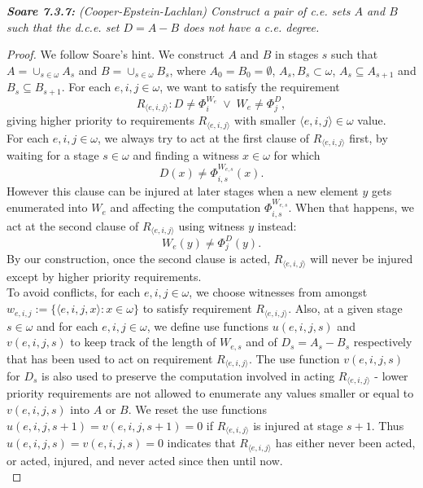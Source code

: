 \documentclass{article}
\begin{document}
\it \textbf{Soare 7.3.7:} (Cooper-Epstein-Lachlan) Construct a pair of c.e.
  sets $A$ and $B$ such that the d.c.e. set $D=A-B$ does not have a c.e.
  degree.

  \begin{proof}
    We follow Soare's hint. We construct $A$ and $B$ in stages $s$ such
    that $A=\cup_{s\in\omega}A_s$ and $B=\cup_{s\in\omega}B_s$, where
    $A_0=B_0=\emptyset$, $A_s,B_s\subset\omega$, $A_s\subseteq A_{s+1}$ and
    $B_s\subseteq B_{s+1}$. For each $e,i,j\in\omega$, we want to satisfy
    the requirement
    \begin{equation}
      R_{\langle e,i,j\rangle}: D\neq \Phi_i^{W_e}\; \vee\;
      W_e\neq\Phi_j^D,
      \label{eq:requirement}
    \end{equation}
    giving higher priority to requirements $R_{\langle e,i,j\rangle}$ with
    smaller $\langle e,i,j\rangle\in\omega$ value. \\

    For each $e,i,j\in\omega$, we always try to act at the first clause
    of $R_{\langle e,i,j\rangle}$ first, by waiting for a stage
    $s\in\omega$ and finding a witness $x\in\omega$ for which
    \[D(x) \neq \Phi_{i,s}^{W_{e,s}}(x).\]
    However this clause can be injured at later stages when a new element
    $y$ gets enumerated into $W_e$ and affecting the computation
    $\Phi_{i,s}^{W_{e,s}}$. When that happens, we act at the second clause
    of $R_{\langle e,i,j\rangle}$ using witness $y$ instead: 
    \[W_e(y) \neq \Phi_j^D(y).\]
    By our construction, once the second clause is acted, $R_{\langle
    e,i,j\rangle}$ will never be injured except by higher priority
    requirements. \\

    To avoid conflicts, for each $e,i,j\in\omega$, we choose witnesses from
    amongst $w_{e,i,j}:=\{\langle e,i,j,x\rangle: x\in\omega\}$ to satisfy
    requirement $R_{\langle e,i,j\rangle}$. Also, at a given stage
    $s\in\omega$ and for each $e,i,j\in\omega$, we define use functions
    $u(e,i,j,s)$ and $v(e,i,j,s)$ to keep track of the length of $W_{e,s}$
    and of $D_s=A_s-B_s$ respectively that has been used to act on
    requirement $R_{\langle e,i,j\rangle}$. The use function $v(e,i,j,s)$
    for $D_s$ is also used to preserve the computation involved in
    acting $R_{\langle e,i,j\rangle}$ - lower priority requirements are
    not allowed to enumerate any values smaller or equal to $v(e,i,j,s)$
    into $A$ or $B$. We reset the use functions
    $u(e,i,j,s+1)=v(e,i,j,s+1)=0$ if $R_{\langle e,i,j\rangle}$ is injured
    at stage $s+1$. Thus $u(e,i,j,s)=v(e,i,j,s)=0$ indicates that
    $R_{\langle e,i,j\rangle}$ has either never been acted, or
    acted, injured, and never acted since then until now. \\


\end{proof}
\end{document}
